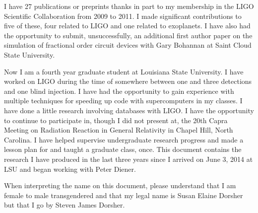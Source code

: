 \documentclass[12pt,letterpaper]{lsuetd}
\begin{document}
I have 27 publications or preprints thanks in part to my membership in the LIGO Scientific Collaboration from 2009 to 2011. I made significant contributions to five of these, four related to LIGO and one related to exoplanets. I have also had the opportunity to submit, unsuccessfully, an additional first author paper on the simulation of fractional order circuit devices with Gary Bohannan at Saint Cloud State University.

Now I am a fourth year graduate student at Louisiana State University. I have worked on LIGO during the time of somewhere between one and three detections and one blind injection. I have had the opportunity to gain experience with multiple techniques for speeding up code with supercomputers in my classes. I have done a little research involving databases with LIGO. I have the opportunity to continue to participate in, though I did not present at, the 20th Capra Meeting on Radiation Reaction in General Relativity in Chapel Hill, North Carolina. I have helped supervise undergraduate research progress and made a lesson plan for and taught a graduate class, once. This document contains the research I have produced in the last three years since I arrived on June 3, 2014 at LSU and began working with Peter Diener.

When interpreting the name on this document, please understand that I am female to male transgendered and that my legal name is Susan Elaine Dorsher but that I go by Steven James Dorsher.
\end{document}
